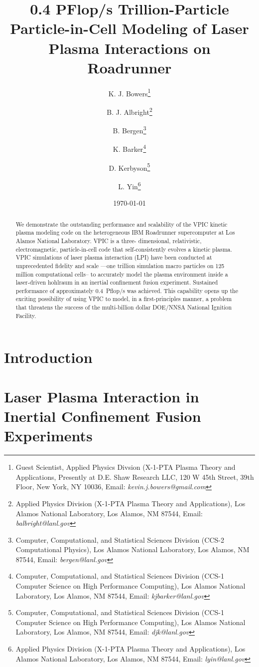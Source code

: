 \documentclass[letter,10pt]{article}
\title{0.4 PFlop/s Trillion-Particle Particle-in-Cell Modeling of Laser Plasma Interactions on Roadrunner}
\author{%
K. J. Bowers\thanks{Guest Scientist, Applied Physics Divsion (X-1-PTA Plasma Theory and Applications, Presently at D.E. Shaw Research LLC, 120 W 45th Street, 39th Floor, New York, NY 10036, Email: \emph{kevin.j.bowers@gmail.com}} \and%
%
B. J. Albright\thanks{Applied Physics Division (X-1-PTA Plasma Theory and Applications), Los Alamos National Laboratory, Los Alamos, NM 87544, Email: \emph{balbright@lanl.gov}} \and%
%
B. Bergen\thanks{Computer, Computational, and Statistical Sciences Division (CCS-2 Computational Physics), Los Alamos National Laboratory, Los Alamos, NM 87544, Email: \emph{bergen@lanl.gov}} \and%
%
K. Barker\thanks{Computer, Computational, and Statistical Sciences Division (CCS-1 Computer Science on High Performance Computing), Los Alamos National Laboratory, Los Alamos, NM 87544, Email: \emph{kjbarker@lanl.gov}} \and%
%
D. Kerbyson\thanks{Computer, Computational, and Statistical Sciences Division (CCS-1 Computer Science on High Performance Computing), Los Alamos National Laboratory, Los Alamos, NM 87544, Email: \emph{djk@lanl.gov}} \and%
%
L. Yin\thanks{Applied Physics Division (X-1-PTA Plasma Theory and Applications), Los Alamos National Laboratory, Los Alamos, NM 87544, Email: \emph{lyin@lanl.gov}}}
\date{\today}
\begin{document}
\maketitle
\thispagestyle{empty}

\begin{singlespace}
\begin{abstract}
We demonstrate the outstanding performance and scalability of the VPIC 
kinetic plasma modeling code on the heterogeneous IBM Roadrunner 
supercomputer at Los Alamos National Laboratory.  VPIC is a three-
dimensional, relativistic, electromagnetic, particle-in-cell code that 
self-consistently evolves a kinetic plasma.  VPIC simulations of laser 
plasma interaction (LPI) have been conducted at unprecedented fidelity 
and scale ---one trillion simulation macro particles on 125 million 
computational cells-- to accurately model the plasma environment 
inside a laser-driven hohlraum in an inertial confinement fusion 
experiment.   Sustained performance of approximately 0.4~Pflop/s was 
achieved.  This capability opens up the exciting possibility of using 
VPIC to model, in a first-principles manner, a problem that threatens 
the success of the multi-billion dollar DOE/NNSA National Ignition Facility.  
\end{abstract}
\end{singlespace}

\pagebreak

\section*{Introduction}

\section*{Laser Plasma Interaction in Inertial Confinement Fusion Experiments}
\end{document}
